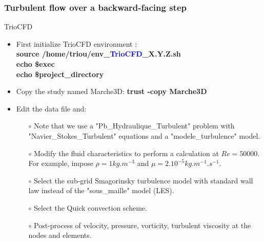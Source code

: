 \documentclass[10pt, hyperref={unicode=true,pdfusetitle, bookmarks=true,bookmarksnumbered=false,bookmarksopen=false, breaklinks=false,pdfborder={0 0 1},backref=true,colorlinks=true,linkcolor=darkblue,pageanchor}]{beamer}
\begin{document}
\begin{frame}
\frametitle{Turbulent flow over a backward-facing step}
\begin{block}{TrioCFD}

\begin{itemize}
\item First initialize TrioCFD environment :\\
{\small{
\textbf{source /home/triou/env\_\textcolor{blue}{TrioCFD}\_X.Y.Z.sh }\\
\textbf{echo \$exec} \\
\textbf{echo \$project\_directory} \\
}}

\item Copy the study named Marche3D: 
\textbf{trust -copy Marche3D}

\item Edit the data file and: \\
    \begin{itemize}
    \item [$\circ$] Note that we use a "Pb\_Hydraulique\_Turbulent" problem with "Navier\_Stokes\_Turbulent" equations and a "modele\_turbulence" model.
    \item [$\circ$] Modify the fluid characteristics to perform a calculation at $Re=50000$. For example, impose $\rho = 1 kg.m^{-3}$ and $\mu=2.10^{-5} kg.m^{-1}.s^{-1}$.
    \item [$\circ$] Select the sub-grid Smagorinsky turbulence model with standard wall law instead of the "sous\_maille" model (LES).
    \item [$\circ$] Select the Quick convection scheme.
    \item [$\circ$] Post-process of velocity, pressure, vorticity, turbulent viscosity at the nodes and elements.
    \end{itemize}

\end{itemize}

\end{block}
\end{frame}
\end{document}
